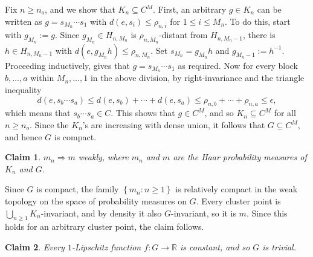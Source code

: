 \documentclass{amsart}
\numberwithin{equation}{subsection}
\theoremstyle{plain}
\theoremstyle{definition}
\theoremstyle{plain}
\newtheorem{claim}[claim]{Claim}
\begin{document}
\smallskip

Fix \(n\geq n_{o}\), and we show that \(K_{n}\subseteq C^{M}\). First, an arbitrary \(g\in K_{n}\) can be written as \(g=s_{M_{n}}\dotsm s_{1}\) with \(d\left(e,s_{i}\right)\leq\rho_{n,i}\) for \(1\leq i\leq M_{n}\). To do this, start with \(g_{M_{n}}:=g\). Since \(g_{M_{n}}\in H_{n,M_{n}}\) is \(\rho_{n,M_{n}}\)-distant from \(H_{n,M_{n}-1}\), there is \(h\in H_{n,M_{n}-1}\) with \(d\left(e,g_{M_{n}}h\right)\leq\rho_{n,M_{n}}\). Set \(s_{M_{n}}=g_{M_{n}}h\) and \(g_{M_{n}-1}:=h^{-1}\). Proceeding inductively, gives that \(g=s_{M_{n}}\dotsm s_{1}\) as required. Now for every block \(b,\dotsc,a\) within \(M_{n},\dotsc,1\) in the above division, by right-invariance and the triangle inequality
\[d\left(e,s_{b}\dotsm s_{a}\right)\leq d\left(e,s_{b}\right)+\dotsm+d\left(e,s_{a}\right)
\leq \rho_{n,b}+\dotsm+\rho_{n,a}\leq\epsilon,\]
which means that \(s_{b}\dotsm s_{a}\in C\). This shows that \(g\in C^{M}\), and so \(K_{n}\subseteq C^{M}\) for all \(n\geq n_{o}\). Since the \(K_{n}\)'s are increasing with dense union, it follows that \(G\subseteq C^{M}\), and hence \(G\) is compact.

\begin{claim}
\(m_{n}\Rightarrow m\) weakly, where \(m_{n}\) and \(m\) are the Haar probability measures of \(K_{n}\) and \(G\).
\end{claim}

Since \(G\) is compact, the family \(\left\{ m_{n}:n\geq1\right\}\) is relatively compact in the weak topology on the space of probability measures on \(G\). Every cluster point is \(\bigcup_{n\geq1}K_{n}\)-invariant, and by density it also \(G\)-invariant, so it is \(m\). Since this holds for an arbitrary cluster point, the claim follows.

\begin{claim}
Every \(1\)-Lipschitz function \(f:G\to\mathbb{R}\) is constant, and so \(G\) is trivial.
\end{claim}
\end{document}
